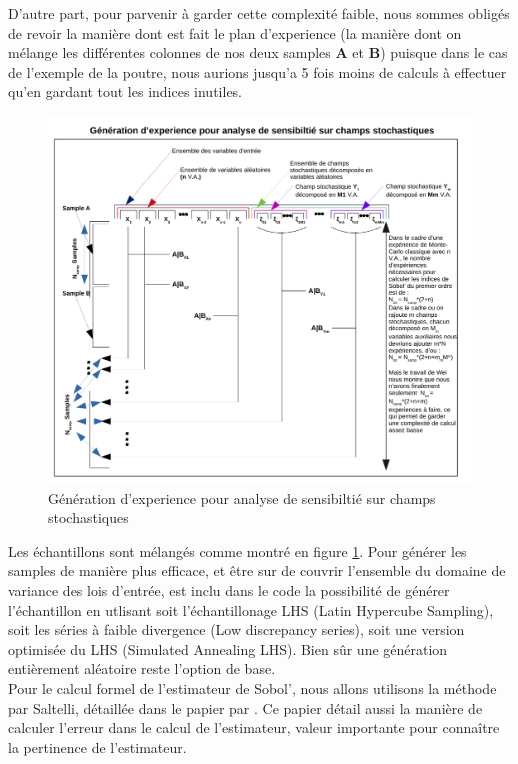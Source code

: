 \documentclass[a4paper,10pt]{article}
\begin{document}
D'autre part, pour parvenir à garder cette complexité faible, nous sommes obligés de revoir la manière dont est fait le plan d'experience (la manière dont on mélange les différentes colonnes de nos deux samples \textbf{A} et \textbf{B}) puisque dans le cas de l'exemple de la poutre, nous aurions jusqu'a 5 fois moins de calculs à effectuer qu'en gardant tout les indices inutiles. \\
\begin{figure}[H]
   \centering   
   \includegraphics[scale=0.75]{Schema_Preparation_VA.pdf}
      \caption{Génération d’experience pour analyse de sensibiltié sur champs stochastiques}
         \label{expGenStoField}
\end{figure}
Les échantillons sont mélangés comme montré en figure \ref{expGenStoField}. 
Pour générer les samples de manière plus efficace, et être sur de couvrir l'ensemble du domaine de variance des lois d'entrée, est inclu dans le code la possibilité de générer l'échantillon en utlisant soit l'échantillonage LHS (Latin Hypercube Sampling), soit les séries à faible divergence (Low discrepancy series), soit une version optimisée du LHS (Simulated Annealing LHS). Bien sûr une génération entièrement aléatoire reste l'option de base.\\

\newpage
Pour le calcul formel de l'estimateur de Sobol', nous allons utilisons la méthode par Saltelli, détaillée dans le papier par \cite{dumas2017}. Ce papier détail aussi la manière de calculer l'erreur dans le calcul de l'estimateur, valeur importante pour connaître la pertinence de l'estimateur. 
\end{document}

